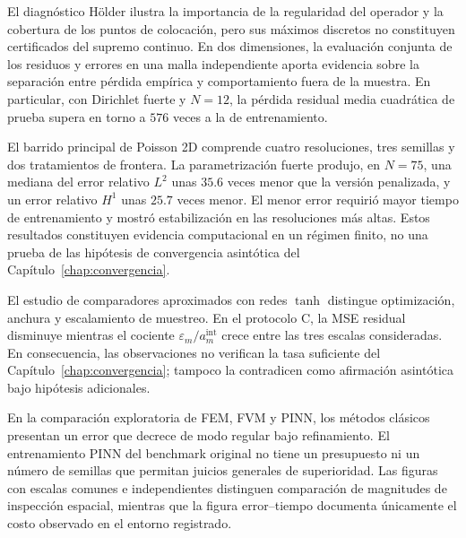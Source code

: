 El diagnóstico H\"older ilustra la importancia de la regularidad del operador y la cobertura de los puntos de colocación, pero sus máximos discretos no constituyen certificados del supremo continuo. En dos dimensiones, la evaluación conjunta de los residuos y errores en una malla independiente aporta evidencia sobre la separación entre pérdida empírica y comportamiento fuera de la muestra. En particular, con Dirichlet fuerte y $N=12$, la pérdida residual media cuadrática de prueba supera en torno a $576$ veces a la de entrenamiento.

El barrido principal de Poisson 2D comprende cuatro resoluciones, tres semillas y dos tratamientos de frontera. La parametrización fuerte produjo, en $N=75$, una mediana del error relativo $L^2$ unas $35.6$ veces menor que la versión penalizada, y un error relativo $H^1$ unas $25.7$ veces menor. El menor error requirió mayor tiempo de entrenamiento y mostró estabilización en las resoluciones más altas. Estos resultados constituyen evidencia computacional en un régimen finito, no una prueba de las hipótesis de convergencia asintótica del Capítulo~\ref{chap:convergencia}.

El estudio de comparadores aproximados con redes $\tanh$ distingue optimización, anchura y escalamiento de muestreo. En el protocolo C, la MSE residual disminuye mientras el cociente $\varepsilon_m/a_m^{\mathrm{int}}$ crece entre las tres escalas consideradas. En consecuencia, las observaciones no verifican la tasa suficiente del Capítulo~\ref{chap:convergencia}; tampoco la contradicen como afirmación asintótica bajo hipótesis adicionales.

En la comparación exploratoria de FEM, FVM y PINN, los métodos clásicos presentan un error que decrece de modo regular bajo refinamiento. El entrenamiento PINN del benchmark original no tiene un presupuesto ni un número de semillas que permitan juicios generales de superioridad. Las figuras con escalas comunes e independientes distinguen comparación de magnitudes de inspección espacial, mientras que la figura error--tiempo documenta únicamente el costo observado en el entorno registrado.
